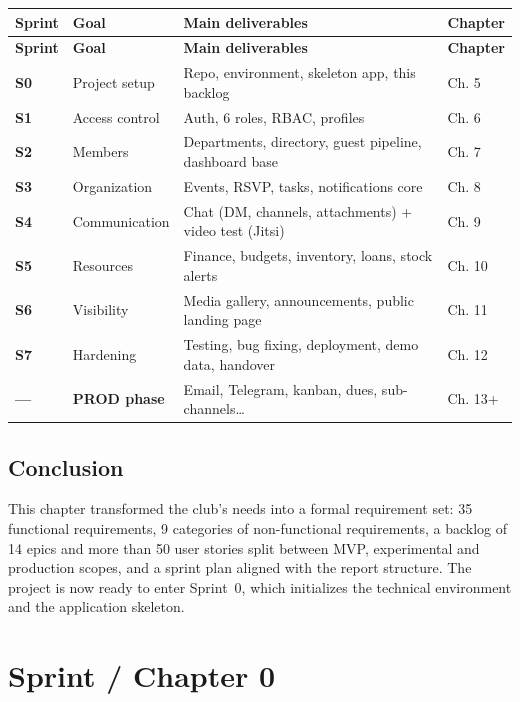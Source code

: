 \documentclass[12pt,a4paper]{report}
\begin{document}
\begin{longtable}{>{\bfseries}p{1.3cm} p{5.2cm} p{5.6cm} p{1.6cm}}
\toprule
\textbf{Sprint} & \textbf{Goal} & \textbf{Main deliverables} & \textbf{Chapter} \\
\midrule
\endfirsthead
\toprule
\textbf{Sprint} & \textbf{Goal} & \textbf{Main deliverables} & \textbf{Chapter} \\
\midrule
\endhead
S0 & Project setup & Repo, environment, skeleton app, this backlog & Ch. 5 \\
S1 & Access control & Auth, 6 roles, RBAC, profiles & Ch. 6 \\
S2 & Members & Departments, directory, guest pipeline, dashboard base & Ch. 7 \\
S3 & Organization & Events, RSVP, tasks, notifications core & Ch. 8 \\
S4 & Communication & Chat (DM, channels, attachments) + video test (Jitsi) & Ch. 9 \\
S5 & Resources & Finance, budgets, inventory, loans, stock alerts & Ch. 10 \\
S6 & Visibility & Media gallery, announcements, public landing page & Ch. 11 \\
S7 & Hardening & Testing, bug fixing, deployment, demo data, handover & Ch. 12 \\
--- & \textbf{PROD phase} & Email, Telegram, kanban, dues, sub-channels\dots & Ch. 13+ \\
\bottomrule
\end{longtable}

\section{Conclusion}

This chapter transformed the club's needs into a formal requirement set: 35 functional
requirements, 9 categories of non-functional requirements, a backlog of 14 epics and more
than 50 user stories split between MVP, experimental and production scopes, and a
sprint plan aligned with the report structure. The project is now ready to enter Sprint~0,
which initializes the technical environment and the application skeleton.

\clearpage

\chapter{Sprint / Chapter 0}
\end{document}

